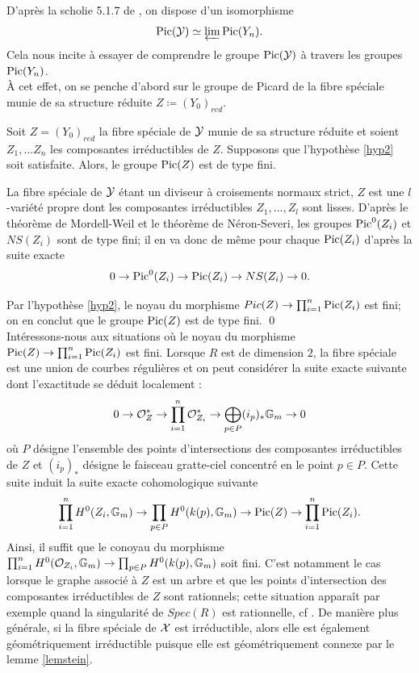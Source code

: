\documentclass[11pt]{article}
\begin{document}
D'après la scholie 5.1.7 de \cite{PMIHES_1961__11__5_0}, on dispose d'un isomorphisme 
$$
\operatorname{Pic}(\mathcal{Y}) \simeq \varprojlim \operatorname{Pic}(Y_n).
$$ Cela nous incite à essayer de comprendre le groupe $\operatorname{Pic}(\mathcal{Y})$ à travers les groupes $\operatorname{Pic}(Y_n)$.\\

À cet effet, on se penche d'abord sur le groupe de Picard de la fibre spéciale munie de sa structure réduite $Z \coloneqq (Y_0)_{red}$.

\begin{lemme}\label{lemPicfinitude}
 Soit $Z = (Y_0)_{red}$ la fibre spéciale de $\mathcal{Y}$ munie de sa structure réduite et soient $Z_1,...Z_n$ les composantes irréductibles de $Z$. Supposons que l'hypothèse \ref{hyp2} soit satisfaite. Alors, le groupe $\operatorname{Pic}(Z)$ est de type fini.
\end{lemme}

\proof
La fibre spéciale de $\mathcal{Y}$ étant un diviseur à croisements normaux strict, $Z$ est une  $l$-variété propre dont les composantes irréductibles $Z_1,...,Z_l$  sont lisses. D'après le théorème de Mordell-Weil et le théorème de Néron-Severi, les groupes $\operatorname{Pic}^0(Z_i)$ et $NS(Z_i)$ sont de type fini; il en va donc de même pour chaque $\operatorname{Pic}(Z_i)$ d'après la suite exacte
$$
0 \rightarrow \operatorname{Pic}^0(Z_i) \rightarrow \operatorname{Pic}(Z_i) \rightarrow NS(Z_i) \rightarrow 0.
$$

Par l'hypothèse \ref{hyp2}, le noyau du morphisme $Pic(Z) \rightarrow \prod_{i=1}^n \operatorname{Pic}(Z_i)$ est fini; on en conclut que le groupe $\operatorname{Pic}(Z)$ est de type fini. \qed 
\\

\rmke Intéressons-nous aux situations où le noyau du morphisme $\operatorname{Pic}(Z) \rightarrow \prod_{i=1}^n \operatorname{Pic}(Z_i)$ est fini. Lorsque $R$ est de dimension $2$, la fibre spéciale est une union de courbes régulières et on peut considérer la suite exacte suivante dont l'exactitude se déduit localement :
$$
0 \rightarrow \mathcal{O}_Z^* \rightarrow \prod_{i=1}^n \mathcal{O}_{Z_i}^* \rightarrow \bigoplus_{p \in P} (i_p)_*\mathbb{G}_m \rightarrow 0
$$
où $P$ désigne l'ensemble des points d'intersections des composantes irréductibles de $Z$ et $(i_p)_*$ désigne le faisceau gratte-ciel concentré en le point $p \in P$. Cette suite induit la suite exacte cohomologique suivante
$$
\prod_{i=1}^n H^0(Z_i, \mathbb{G}_m) \rightarrow \prod_{p \in P} H^0(k(p), \mathbb{G}_m)  \rightarrow \operatorname{Pic}(Z) \rightarrow \prod_{i=1}^n \operatorname{Pic}(Z_i).
$$
Ainsi, il suffit que le conoyau du morphisme $\prod_{i=1}^n H^0(\mathcal{O}_{Z_i}, \mathbb{G}_m) \rightarrow \prod_{p \in P} H^0(k(p), \mathbb{G}_m)$ soit fini. C'est notamment le cas lorsque le graphe associé à $Z$ est un arbre et que les points d'intersection des composantes irréductibles de $Z$ sont rationnels; cette situation apparaît par exemple quand la singularité de $Spec(R)$ est rationnelle, cf \cite{Lipman-rational}.
De manière plus générale, si la fibre spéciale de $\mathcal{X}$ est irréductible, alors elle est également géométriquement irréductible puisque elle est géométriquement connexe par le lemme \ref{lemstein}. \\
\end{document}
